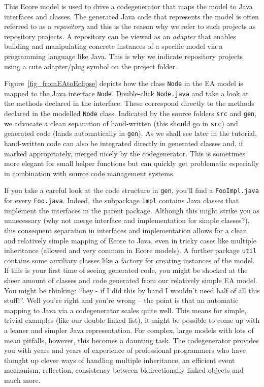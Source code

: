 This Ecore model is used to drive a codegenerator that maps the model to Java
interfaces and classes.  The generated Java code that represents the model is
often referred to as a \emph{repository} and this is the reason why we refer to
such projects as repository projects.  A repository can be viewed as an
\emph{adapter} that enables building and manipulating concrete instances of a
specific model via a programming language like Java.  This is why we
indicate repository projects using a cute adapter/plug symbol on the project
folder.

Figure~\ref{fig_fromEAtoEclipse} depicts how the class \texttt{Node} in the EA
model is mapped to the Java interface \texttt{Node}.  Double-click
\texttt{Node.java} and take a look at the methods declared in the interface.
These correspond directly to the methods declared in the modelled \texttt{Node}
class.  Indicated by the source folders \texttt{src} and \texttt{gen}, we
advocate a clean separation of hand-written (this should go in \texttt{src}) and
generated code (lands automatically in \texttt{gen}).  As we shall see later in
the tutorial, hand-written code can also be integrated directly in generated
classes and, if marked appropriately, merged nicely by the codegenerator. 
This is sometimes more elegant for small helper functions but can quickly get
problematic especially in combination with source code management systems.

If you take a careful look at the code structure in \texttt{gen},
you'll find a \texttt{Foo\-Impl.java} for every \texttt{Foo.java}. Indeed, the 
subpackage \texttt{impl} contains Java classes that implement the interfaces in
the parent package.  Although this might strike you as unnecessary (why not
merge interface and implementation for simple classes?), this consequent
separation in interfaces and implementation allows for a clean and relatively
simple mapping of Ecore to Java, even in tricky cases like multiple inheritance
(allowed and very common in Ecore models).  A further package \texttt{util}
contains some auxiliary classes like a factory for creating instances of the
model.  If this is your first time of seeing generated code, you might be
shocked at the sheer amount of classes and code generated from our relatively
simple EA model.  You might be thinking: ``hey - if I did this by hand I
wouldn't need half of all this stuff!''.  Well you're right and you're wrong --
the point is that an automatic mapping to Java via a codegenerator scales quite
well.  This means for simple, trivial examples (like our double linked list), it
might be possible to come up with a leaner and simpler Java representation.  For
complex, large models with lots of mean pitfalls, however, this becomes a
daunting task.  The codegenerator provides you with years and years of
experience of professional programmers who have thought up clever ways
of handling multiple inheritance, an efficient event mechanism, reflection,
consistency between bidirectionally linked objects and much more.

